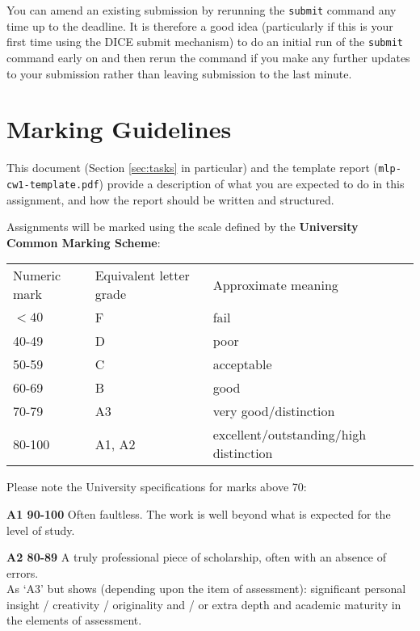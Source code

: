 \documentclass[11pt,]{article}
\begin{document}
You can amend an existing submission by rerunning the \texttt{submit}
command any time up to the deadline. It is therefore a good idea
(particularly if this is your first time using the DICE submit
mechanism) to do an initial run of the \texttt{submit} command early on
and then rerun the command if you make any further updates to your
submission rather than leaving submission to the last minute.

\newpage
\section{Marking Guidelines}
\label{sec:marking-scheme}
This document (Section \ref{sec:tasks} in particular) and the template report (\verb+mlp-cw1-template.pdf+) provide a description of what you are expected to do in this assignment, and how the report should be written and structured.

Assignments will be marked using the scale defined by the \textbf{University Common Marking Scheme}:
\begin{center}
\begin{tabular}{lll}
Numeric mark & Equivalent letter grade & Approximate meaning \\
$< 40$ & F & fail \\
40-49 & D & poor \\
50-59 & C & acceptable \\
60-69 & B & good \\
70-79 & A3 & very good/distinction \\
80-100 & A1, A2 & excellent/outstanding/high distinction
\end{tabular}
\end{center}

Please note the University specifications for marks above 70:

{\bf A1 90-100}
Often faultless. The work is well beyond what is expected for the level of study.

{\bf A2 80-89}
A truly professional piece of scholarship, often with an absence of errors. \\
As `A3' but shows (depending upon the item of assessment):
significant personal insight / creativity / originality
and / or
extra depth and academic maturity in the elements of assessment.
\end{document}
